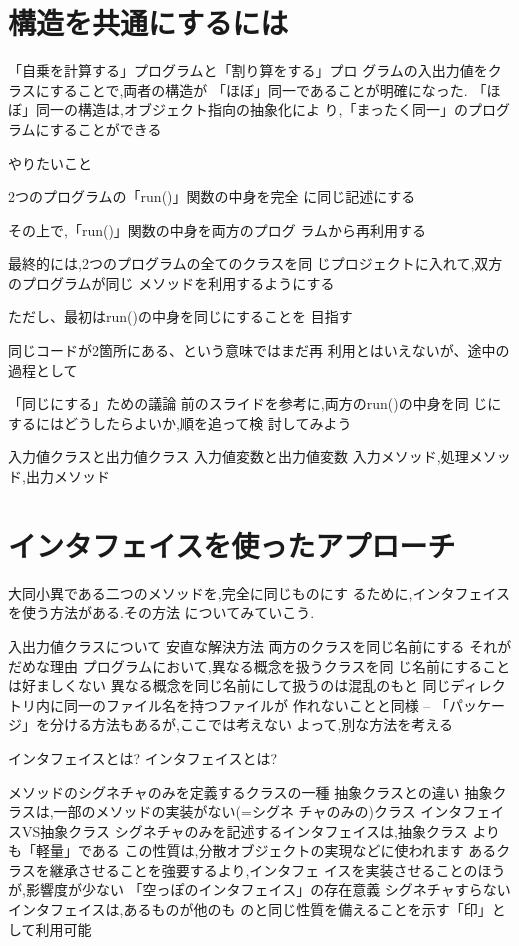 \documentclass[a4j, twoside]{jsbook}
\begin{document}
\section{構造を共通にするには}
「自乗を計算する」プログラムと「割り算をする」プロ
グラムの入出力値をクラスにすることで,両者の構造が
「ほぼ」同一であることが明確になった.
「ほぼ」同一の構造は,オブジェクト指向の抽象化によ
り,「まったく同一」のプログラムにすることができる

やりたいこと

2つのプログラムの「run()」関数の中身を完全
に同じ記述にする

その上で,「run()」関数の中身を両方のプログ
ラムから再利用する

 最終的には,2つのプログラムの全てのクラスを同
じプロジェクトに入れて,双方のプログラムが同じ
メソッドを利用するようにする

ただし、最初はrun()の中身を同じにすることを
目指す

 同じコードが2箇所にある、という意味ではまだ再
利用とはいえないが、途中の過程として

「同じにする」ための議論
前のスライドを参考に,両方のrun()の中身を同
じにするにはどうしたらよいか,順を追って検
討してみよう

 入力値クラスと出力値クラス
 入力値変数と出力値変数
 入力メソッド,処理メソッド,出力メソッド

\section{インタフェイスを使ったアプローチ}

大同小異である二つのメソッドを,完全に同じものにす
るために,インタフェイスを使う方法がある.その方法
についてみていこう.

入出力値クラスについて
安直な解決方法
 両方のクラスを同じ名前にする
それがだめな理由
 プログラムにおいて,異なる概念を扱うクラスを同
じ名前にすることは好ましくない
 異なる概念を同じ名前にして扱うのは混乱のもと
 同じディレクトリ内に同一のファイル名を持つファイルが
作れないことと同様
– 「パッケージ」を分ける方法もあるが,ここでは考えない
よって,別な方法を考える

インタフェイスとは?
インタフェイスとは?

 メソッドのシグネチャのみを定義するクラスの一種
抽象クラスとの違い
 抽象クラスは,一部のメソッドの実装がない(=シグネ
チャのみの)クラス
インタフェイスVS抽象クラス
 シグネチャのみを記述するインタフェイスは,抽象クラス
よりも「軽量」である
 この性質は,分散オブジェクトの実現などに使われます
 あるクラスを継承させることを強要するより,インタフェ
イスを実装させることのほうが,影響度が少ない
「空っぽのインタフェイス」の存在意義
 シグネチャすらないインタフェイスは,あるものが他のも
のと同じ性質を備えることを示す「印」として利用可能
\end{document}
